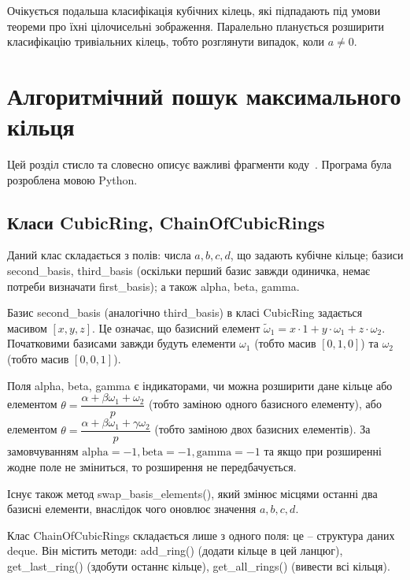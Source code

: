 \documentclass{thesis}
\begin{document}
Очікується подальша класифікація кубічних кілець, які підпадають під умови теореми про їхні цілочисельні зображення. Паралельно планується розширити класифікацію тривіальних кілець, тобто розглянути випадок, коли $a \neq 0$.

\newpage

\renewcommand{\bibname}{Список використаних джерел}



\appendix

\chapter{Алгоритмічний пошук максимального кільця}\label{appendix1}
Цей розділ стисло та словесно описує важливі фрагменти коду~\cite{ringextensioncode}. Програма була розроблена мовою Python.

\section{Класи CubicRing, ChainOfCubicRings}\label{appendix1.1}
Даний клас складається з полів: числа $a,b,c,d$, що задають кубічне кільце; базиси second\_basis, third\_basis (оскільки перший базис завжди одиничка, немає потреби визначати first\_basis); а також alpha, beta, gamma.

Базис second\_basis (аналогічно third\_basis) в класі CubicRing задається масивом $[x,y,z]$. Це означає, що базисний елемент $\tilde{\omega}_1 = x \cdot 1 + y \cdot \omega_1 + z \cdot \omega_2$. Початковими базисами завжди будуть елементи $\omega_1$ (тобто масив $[0,1,0]$) та $\omega_2$ (тобто масив $[0,0,1]$).

Поля alpha, beta, gamma є індикаторами, чи можна розширити дане кільце або елементом $\theta = \dfrac{\alpha+\beta \omega_1 + \omega_2}{p}$ (тобто заміною одного базисного елементу), або елементом $\theta = \dfrac{\alpha + \beta \omega_1 + \gamma \omega_2}{p}$ (тобто заміною двох базисних елементів). За замовчуванням $\text{alpha} = -1, \text{beta} = -1, \text{gamma} = -1$ та якщо при розширенні жодне поле не зміниться, то розширення не передбачується.

Існує також метод swap\_basis\_elements(), який змінює місцями останні два базисні елементи, внаслідок чого оновлює значення $a,b,c,d$.

Клас ChainOfCubicRings складається лише з одного поля: це -- структура даних deque. Він містить методи: add\_ring() (додати кільце в цей ланцюг), get\_last\_ring() (здобути останнє кільце), get\_all\_rings() (вивести всі кільця).
\end{document}
